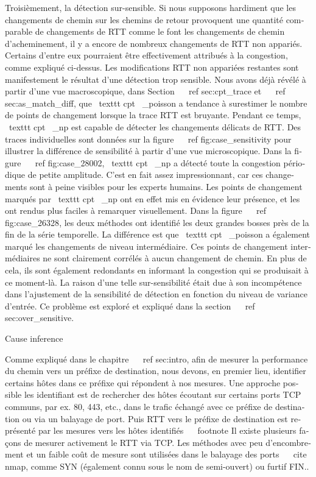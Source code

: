 \begin{otherlanguage}{french}
Troisièmement, la détection sur-sensible.
Si nous supposons hardiment que les changements de chemin sur les chemins de retour provoquent une quantité comparable de changements de RTT comme le font les changements de chemin d'acheminement, il y a encore de nombreux changements de RTT non appariés.
Certains d'entre eux pourraient être effectivement attribués à la congestion, comme expliqué ci-dessus.
Les modifications RTT non appariées restantes sont manifestement le résultat d'une détection trop sensible.
Nous avons déjà révélé à partir d'une vue macroscopique, dans Section ~ \ ref {sec:cpt_trace} et ~ \ ref {sec:as_match_diff}, que \ texttt {cpt \ _poisson} a tendance à surestimer le nombre de points de changement lorsque la trace RTT est bruyante.
Pendant ce temps, \ texttt {cpt \ _np} est capable de détecter les changements délicats de RTT.
Des traces individuelles sont données sur la figure ~ \ ref {fig:case_sensitivity} pour illustrer la différence de sensibilité à partir d'une vue microscopique.
Dans la figure ~ \ ref {fig:case_28002}, \ texttt {cpt \ _np} a détecté toute la congestion périodique de petite amplitude.
C'est en fait assez impressionnant, car ces changements sont à peine visibles pour les experts humains.
Les points de changement marqués par \ texttt {cpt \ _np} ont en effet mis en évidence leur présence, et les ont rendus plus faciles à remarquer visuellement.
Dans la figure ~ \ ref {fig:case_26328}, les deux méthodes ont identifié les deux grandes bosses près de la fin de la série temporelle.
La différence est que \ texttt {cpt \ _poisson} a également marqué les changements de niveau intermédiaire.
Ces points de changement intermédiaires ne sont clairement corrélés à aucun changement de chemin.
En plus de cela, ils sont également redondants en informant la congestion qui se produisait à ce moment-là.
La raison d'une telle sur-sensibilité était due à son incompétence dans l'ajustement de la sensibilité de détection en fonction du niveau de variance d'entrée. Ce problème est exploré et expliqué dans la section ~ \ ref {sec:over_sensitive}.

Cause inference

Comme expliqué dans le chapitre ~ \ ref {sec:intro}, afin de mesurer la performance du chemin vers un préfixe de destination, nous devons, en premier lieu, identifier certains hôtes dans ce préfixe qui répondent à nos mesures.
Une approche possible les identifiant est de rechercher des hôtes écoutant sur certains ports TCP communs, par ex. 80, 443, etc., dans le trafic échangé avec ce préfixe de destination ou via un balayage de port.
Puis RTT vers le préfixe de destination est représenté par les mesures vers les hôtes identifiés ~ \ footnote {Il existe plusieurs façons de mesurer activement le RTT via TCP. Les méthodes avec peu d'encombrement et un faible coût de mesure sont utilisées dans le balayage des ports ~ \ cite {nmap}, comme SYN (également connu sous le nom de semi-ouvert) ou furtif FIN.}.


\end{otherlanguage}
